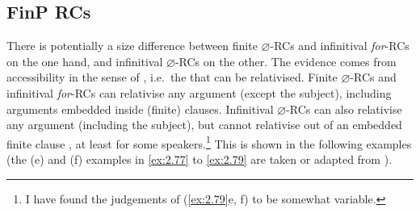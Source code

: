 \documentclass[output=paper]{langsci/langscibook}
\begin{document}
\subsection{FinP RCs}\largerpage

There is potentially a size difference between finite $\varnothing$-\glspl{RC}
and infinitival \emph{for}-\glspl{RC} on the one hand, and infinitival
$\varnothing$-\glspl{RC} on the other. The evidence comes from accessibility in
the sense of \textcite{KeenanComrie1977}, i.e.\ the  that
can be relativised. Finite $\varnothing$-\glspl{RC} and infinitival
\emph{for}-\glspl{RC} can relativise any argument (except the subject),
including arguments embedded inside (finite) clauses. Infinitival
$\varnothing$-\glspl{RC} can also relativise any argument (including the
subject), but cannot relativise out of an embedded finite clause
\citep{Longenbaugh2016}, at least for some speakers.\footnote{I have found the
judgements of (\ref{ex:2.79}e, f) to be somewhat variable.} This is shown in the following
examples (the (e) and (f) examples in \eqref{ex:2.77} to
\eqref{ex:2.79} are taken or adapted from
\citealt{Longenbaugh2016}).
\end{document}
